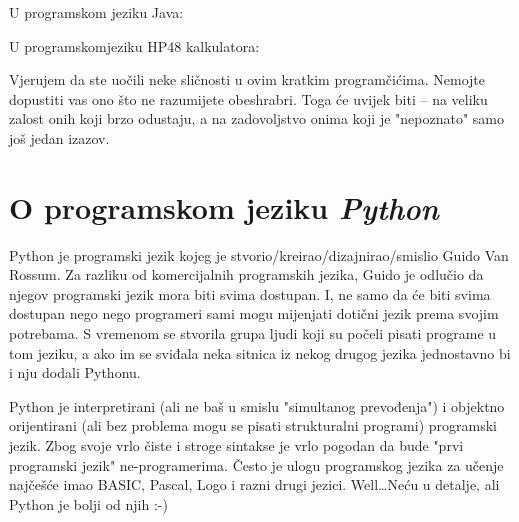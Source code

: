	U programskom jeziku Java:

	
	U programskomjeziku HP48 kalkulatora:

	

	Vjerujem da ste uočili neke sličnosti u ovim kratkim programčićima.
	Nemojte dopustiti vas ono što ne razumijete obeshrabri. Toga će uvijek
	biti -- na veliku zalost onih koji brzo odustaju, a na zadovoljstvo onima koji
	je "nepoznato" samo još jedan izazov.

\section{O programskom jeziku \emph{Python}}

	Python je programski jezik kojeg je stvorio/kreirao/dizajnirao/smislio Guido Van
	Rossum. Za razliku od komercijalnih programskih jezika, Guido je odlučio da
	njegov programski jezik mora biti svima dostupan. I, ne samo da će biti svima
	dostupan nego nego programeri sami mogu mijenjati dotični jezik prema svojim
	potrebama. S vremenom se stvorila grupa ljudi koji su počeli pisati programe u
	tom jeziku, a ako im se sviđala neka sitnica iz nekog drugog jezika jednostavno
	bi i nju dodali Pythonu.

	Python je interpretirani (ali ne baš u smislu "simultanog prevođenja") i
	objektno orijentirani (ali bez problema mogu se pisati strukturalni programi)
	programski jezik. Zbog svoje vrlo čiste i stroge sintakse je vrlo pogodan da
	bude "prvi programski jezik" ne-programerima. Često je ulogu programskog jezika
	za učenje najčešće imao BASIC, Pascal, Logo i razni drugi jezici. 
	Well\dots Neću u detalje, ali Python je bolji od njih :-)

